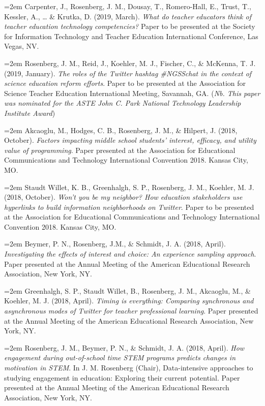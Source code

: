 \documentclass[]{article}
\begin{document}
\hangindent=2em Carpenter, J., Rosenberg, J. M., Dousay, T.,
Romero-Hall, E., Trust, T., Kessler, A., \ldots{} \& Krutka, D. (2019,
March). \emph{What do teacher educators think of teacher education
technology competencies?} Paper to be presented at the Society for
Information Technology and Teacher Education International Conference,
Las Vegas, NV.

\hangindent=2em Rosenberg, J. M., Reid, J., Koehler, M. J., Fischer, C.,
\& McKenna, T. J. (2019, January). \emph{The roles of the Twitter
hashtag \#NGSSchat in the context of science education reform efforts}.
Paper to be presented at the Association for Science Teacher Education
International Meeting, Savannah, GA. (\emph{Nb. This paper was nominated
for the ASTE John C. Park National Technology Leadership Institute
Award})

\hangindent=2em Akcaoglu, M., Hodges, C. B., Rosenberg, J. M., \&
Hilpert, J. (2018, October). \emph{Factors impacting middle school
students' interest, efficacy, and utility value of programming}. Paper
presented at the Association for Educational Communications and
Technology International Convention 2018. Kansas City, MO.

\hangindent=2em Staudt Willet, K. B., Greenhalgh, S. P., Rosenberg, J.
M., Koehler, M. J. (2018, October). \emph{Won't you be my neighbor? How
education stakeholders use hyperlinks to build information neighborhoods
on Twitter}. Paper to be presented at the Association for Educational
Communications and Technology International Convention 2018. Kansas
City, MO.

\hangindent=2em Beymer, P. N., Rosenberg, J.M., \& Schmidt, J. A. (2018,
April). \emph{Investigating the effects of interest and choice: An
experience sampling approach}. Paper presented at the Annual Meeting of
the American Educational Research Association, New York, NY.

\hangindent=2em Greenhalgh, S. P., Staudt Willet, B., Rosenberg, J. M.,
Akcaoglu, M., \& Koehler, M. J. (2018, April). \emph{Timing is
everything: Comparing synchronous and asynchronous modes of Twitter for
teacher professional learning}. Paper presented at the Annual Meeting of
the American Educational Research Association, New York, NY.

\hangindent=2em Rosenberg, J. M., Beymer, P. N., \& Schmidt, J. A.
(2018, April). \emph{How engagement during out-of-school time STEM
programs predicts changes in motivation in STEM}. In J. M. Rosenberg
(Chair), Data-intensive approaches to studying engagement in education:
Exploring their current potential. Paper presented at the Annual Meeting
of the American Educational Research Association, New York, NY.
\end{document}
